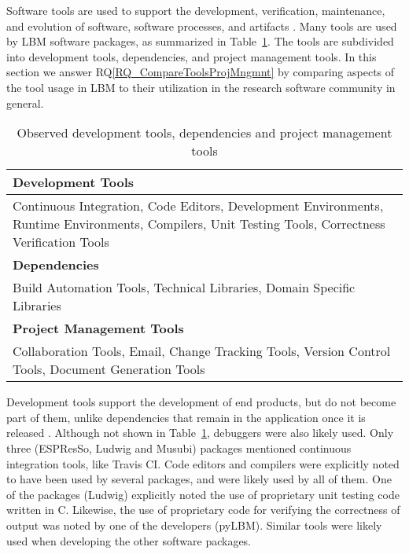 \documentclass[runningheads]{llncs}
\newcommand{\rqref}[1]{RQ\ref{#1}}
\begin{document}
Software tools are used to support the development, verification, maintenance,
and evolution of software, software processes, and artifacts \cite[p.\
501]{GhezziEtAl2003}. Many tools are used by LBM software packages, as
summarized in Table~\ref{tbl_tools}.  The tools are subdivided into development
tools, dependencies, and project management tools.  In this section we answer
\rqref{RQ_CompareToolsProjMngmnt} by comparing aspects of the tool usage in LBM
to their utilization in the research software community in general.

\begin{table}
\begin{center}
\begin{tabular}{ p{12 cm}}
\textbf{Development Tools}\\
\midrule
Continuous Integration, Code Editors, Development Environments, Runtime
Environments, Compilers, Unit Testing Tools, Correctness Verification Tools\\
\textbf{Dependencies}\\
\midrule
Build Automation Tools, Technical Libraries, Domain Specific Libraries\\
\textbf{Project Management Tools}\\
\midrule
Collaboration Tools, Email, Change Tracking Tools, Version Control Tools, Document Generation Tools\\
\end{tabular}
\caption{Observed development tools, dependencies and project management tools} 
\label{tbl_tools}
\end{center}
\end{table}
	
Development tools support the development of end products, but do not become
part of them, unlike dependencies that remain in the application once it is
released \cite[p.\ 506]{GhezziEtAl2003}. Although not shown in
Table~\ref{tbl_tools}, debuggers were also likely used.  Only three (ESPResSo,
Ludwig and Musubi) packages mentioned continuous integration tools, like Travis
CI. Code editors and compilers were explicitly noted to have been used by
several packages, and were likely used by all of them. One of the packages
(Ludwig) explicitly noted the use of proprietary unit testing code written in C.
Likewise, the use of proprietary code for verifying the correctness of output
was noted by one of the developers (pyLBM). Similar tools were likely used when
developing the other software packages.
\end{document}
